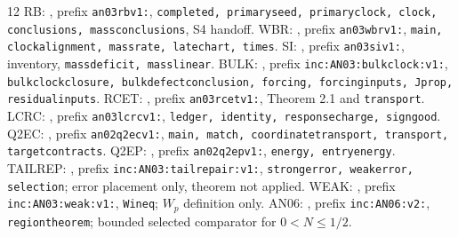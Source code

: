 \documentclass[11pt]{article}
\numberwithin{equation}{section}
\theoremstyle{remark}\newtheorem{remark}[theorem]{Remark}
\begin{document}
\begin{thebibliography}{12}\small
{} RB: , prefix
\texttt{an03rbv1:}, \texttt{completed, primaryseed, primaryclock,
clock, conclusions, massconclusions}, S4 handoff.
 WBR: , prefix
\texttt{an03wbrv1:}, \texttt{main, clockalignment, massrate,
latechart, times}.
 SI: , prefix
\texttt{an03siv1:}, inventory, \texttt{massdeficit, masslinear}.
 BULK: ,
prefix \texttt{inc:AN03:bulkclock:v1:}, \texttt{bulkclockclosure,
bulkdefectconclusion, forcing, forcinginputs, Jprop, residualinputs}.
 RCET: ,
prefix \texttt{an03rcetv1:}, Theorem 2.1 and \texttt{transport}.
 LCRC: ,
prefix \texttt{an03lcrcv1:}, \texttt{ledger, identity, responsecharge,
signgood}.
 Q2EC: , prefix
\texttt{an02q2ecv1:}, \texttt{main, match, coordinatetransport,
transport, targetcontracts}.
 Q2EP: ,
prefix \texttt{an02q2epv1:}, \texttt{energy, entryenergy}.
 TAILREP: ,
prefix \texttt{inc:AN03:tailrepair:v1:}, \texttt{strongerror,
weakerror, selection}; error placement only, theorem not applied.
 WEAK: ,
prefix \texttt{inc:AN03:weak:v1:}, \texttt{Wineq}; $W_p$ definition only.
 AN06: ,
prefix \texttt{inc:AN06:v2:}, \texttt{regiontheorem}; bounded selected
comparator for $0<N\le1/2$.
\end{thebibliography}
\end{document}
